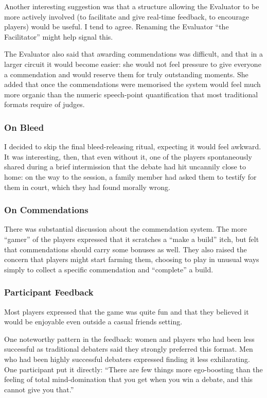 \documentclass[12pt]{article}
\begin{document}
Another interesting suggestion was that a structure allowing the Evaluator to be more actively involved (to facilitate and give real-time feedback, to encourage players) would be useful. I tend to agree. Renaming the Evaluator ``the Facilitator'' might help signal this.

The Evaluator also said that awarding commendations was difficult, and that in a larger circuit it would become easier: she would not feel pressure to give everyone a commendation and would reserve them for truly outstanding moments. She added that once the commendations were memorised the system would feel much more organic than the numeric speech-point quantification that most traditional formats require of judges.

\subsubsection{On Bleed}

I decided to skip the final bleed-releasing ritual, expecting it would feel awkward. It was interesting, then, that even without it, one of the players spontaneously shared during a brief intermission that the debate had hit uncannily close to home: on the way to the session, a family member had asked them to testify for them in court, which they had found morally wrong.

\subsubsection{On Commendations}

There was substantial discussion about the commendation system. The more ``gamer'' of the players expressed that it scratches a ``make a build'' itch, but felt that commendations should carry some bonuses as well. They also raised the concern that players might start farming them, choosing to play in unusual ways simply to collect a specific commendation and ``complete'' a build.

\subsubsection{Participant Feedback}

Most players expressed that the game was quite fun and that they believed it would be enjoyable even outside a casual friends setting.

One noteworthy pattern in the feedback: women and players who had been less successful as traditional debaters said they strongly preferred this format. Men who had been highly successful debaters expressed finding it less exhilarating. One participant put it directly: ``There are few things more ego-boosting than the feeling of total mind-domination that you get when you win a debate, and this cannot give you that.''
\end{document}
